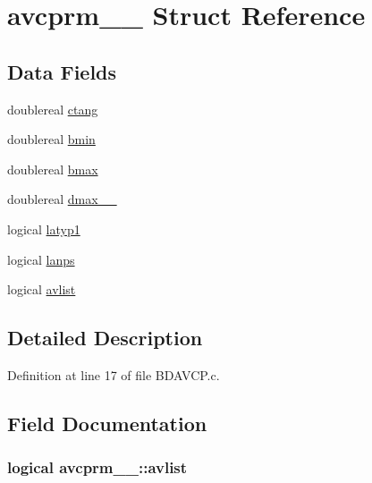 \hypertarget{structavcprm__1__}{}\section{avcprm\+\_\+\_\+ Struct Reference}
\label{structavcprm__1__}
\subsection*{Data Fields}
\begin{DoxyCompactItemize}
\item 
doublereal \hyperlink{structavcprm__1___a11994c810fc103d5be32914c00129c95}{ctang}
\item 
doublereal \hyperlink{structavcprm__1___a8cb8e2a1b34cb26a2abfbb00918fa9dc}{bmin}
\item 
doublereal \hyperlink{structavcprm__1___abc0a5e3d77e3b5aadd4f515a82ba660d}{bmax}
\item 
doublereal \hyperlink{structavcprm__1___ac5d7e0e2050cc99b5aa55dd602359a6d}{dmax\+\_\+\+\_\+}
\item 
logical \hyperlink{structavcprm__1___a835c7eb09f62523bf129afee6e2e5a24}{latyp1}
\item 
logical \hyperlink{structavcprm__1___a40d76c824e2159cdbfb51f40cefeef5c}{lanps}
\item 
logical \hyperlink{structavcprm__1___a52b17da103f3e8d5acf1344079430cb0}{avlist}
\end{DoxyCompactItemize}


\subsection{Detailed Description}


Definition at line 17 of file B\+D\+A\+V\+C\+P.\+c.



\subsection{Field Documentation}
\subsubsection[{\texorpdfstring{avlist}{avlist}}]{\setlength{\rightskip}{0pt plus 5cm}logical avcprm\+\_\+\_\+\+::avlist}\hypertarget{structavcprm__1___a52b17da103f3e8d5acf1344079430cb0}{}\label{structavcprm__1___a52b17da103f3e8d5acf1344079430cb0}


